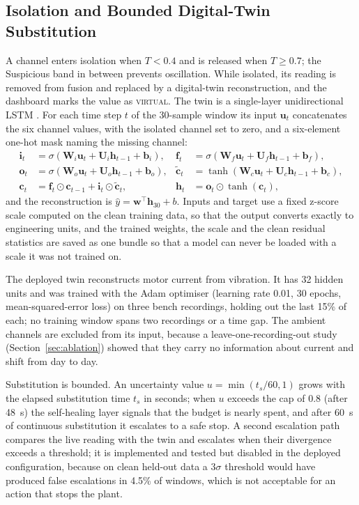 \documentclass[11pt,a4paper]{article}
\begin{document}
\subsection{Isolation and Bounded Digital-Twin Substitution}
\label{sec:twin}

A channel enters isolation when $T < 0.4$ and is released when $T \geq 0.7$; the Suspicious band in between prevents oscillation. While isolated, its reading is removed from fusion and replaced by a digital-twin reconstruction, and the dashboard marks the value as \textsc{virtual}. The twin is a single-layer unidirectional LSTM \cite{hochreiter1997lstm}. For each time step $t$ of the 30-sample window its input $\mathbf{u}_t$ concatenates the six channel values, with the isolated channel set to zero, and a six-element one-hot mask naming the missing channel:
\begin{align}
\mathbf{i}_t &= \sigma(\mathbf{W}_i \mathbf{u}_t + \mathbf{U}_i \mathbf{h}_{t-1} + \mathbf{b}_i), &
\mathbf{f}_t &= \sigma(\mathbf{W}_f \mathbf{u}_t + \mathbf{U}_f \mathbf{h}_{t-1} + \mathbf{b}_f), \nonumber\\
\mathbf{o}_t &= \sigma(\mathbf{W}_o \mathbf{u}_t + \mathbf{U}_o \mathbf{h}_{t-1} + \mathbf{b}_o), &
\tilde{\mathbf{c}}_t &= \tanh(\mathbf{W}_c \mathbf{u}_t + \mathbf{U}_c \mathbf{h}_{t-1} + \mathbf{b}_c), \nonumber\\
\mathbf{c}_t &= \mathbf{f}_t \odot \mathbf{c}_{t-1} + \mathbf{i}_t \odot \tilde{\mathbf{c}}_t, &
\mathbf{h}_t &= \mathbf{o}_t \odot \tanh(\mathbf{c}_t),
\end{align}
and the reconstruction is $\hat{y} = \mathbf{w}^{\top}\mathbf{h}_{30} + b$. Inputs and target use a fixed z-score scale computed on the clean training data, so that the output converts exactly to engineering units, and the trained weights, the scale and the clean residual statistics are saved as one bundle so that a model can never be loaded with a scale it was not trained on.

The deployed twin reconstructs motor current from vibration. It has 32 hidden units and was trained with the Adam optimiser (learning rate 0.01, 30 epochs, mean-squared-error loss) on three bench recordings, holding out the last 15\% of each; no training window spans two recordings or a time gap. The ambient channels are excluded from its input, because a leave-one-recording-out study (Section~\ref{sec:ablation}) showed that they carry no information about current and shift from day to day.

Substitution is bounded. An uncertainty value $u = \min(t_s/60, 1)$ grows with the elapsed substitution time $t_s$ in seconds; when $u$ exceeds the cap of 0.8 (after 48~s) the self-healing layer signals that the budget is nearly spent, and after 60~s of continuous substitution it escalates to a safe stop. A second escalation path compares the live reading with the twin and escalates when their divergence exceeds a threshold; it is implemented and tested but disabled in the deployed configuration, because on clean held-out data a $3\sigma$ threshold would have produced false escalations in 4.5\% of windows, which is not acceptable for an action that stops the plant.
\end{document}
